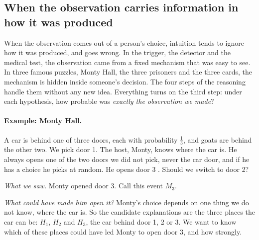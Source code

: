 \subsection{When the observation carries information in how it was produced}

When the observation comes out of a person's choice, intuition tends to ignore
how it was produced, and goes wrong. In the trigger, the detector and the
medical test, the observation came from a fixed mechanism that was easy to see.
In three famous puzzles, Monty Hall, the three prisoners and the three cards,
the mechanism is hidden inside someone's decision.
The four steps of the reasoning handle them without any new idea. Everything
turns on the third step: under each hypothesis, how probable was \emph{exactly
the observation we made}?

\paragraph{Example: Monty Hall.}
A car is behind one of three doors, each with probability $\tfrac13$, and goats
are behind the other two. We pick door 1. The host, Monty, knows where the car
is. He always opens one of the two doors we did not pick, never the car door,
and if he has a choice he picks at random. He opens door 3
. Should we switch to door 2?

\emph{What we saw.} Monty opened door 3. Call this event $M_3$.

\emph{What could have made him open it?} Monty's choice depends on one thing
we do not know, where the car is. So the candidate explanations are the
three places the car can be: $H_1$, $H_2$ and $H_3$, the car behind door 1,
2 or 3. We want to know which of these places could have led Monty to open
door 3, and how strongly.

